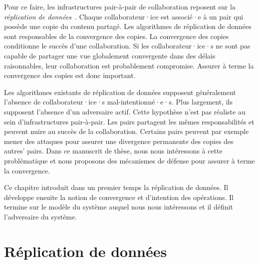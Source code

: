 Pour ce faire, les infrastructures pair-à-pair de collaboration reposent sur la \emph{réplication de données}~\autocite{saito_2005_optimisticreplication}.
Chaque collaborateur·ice est associé·e à un pair qui possède une copie du contenu partagé.
Les algorithmes de réplication de données sont responsables de la convergence des copies.
La convergence des copies conditionne le succès d'une collaboration.
Si les collaborateur·ice·s ne sont pas capable de partager une vue globalement convergente dans des délais raisonnables, leur collaboration est probablement compromise.
Assurer à terme la convergence des copies est donc important.

Les algorithmes existants de réplication de données supposent généralement l'absence de collaborateur·ice·s mal-intentionné·e·s.
Plus largement, ils supposent l'absence d'un adversaire actif.
Cette hypothèse n'est pas réaliste au sein d'infrastructures pair-à-pair.
Les pairs partagent les mêmes responsabilités et peuvent nuire au succès de la collaboration.
Certains pairs peuvent par exemple mener des attaques pour assurer une divergence permanente des copies des autres' pairs.
Dans ce manuscrit de thèse, nous nous intéressons à cette problématique et nous proposons des mécanismes de défense pour assurer à terme la convergence.

Ce chapitre introduit dans un premier temps la réplication de données. Il développe ensuite la notion de convergence et d'intention des opérations.
Il termine sur le modèle du système auquel nous nous intéressons et il définit l'adversaire du système.

\section{Réplication de données}\label{sec:optimistic-replication}

